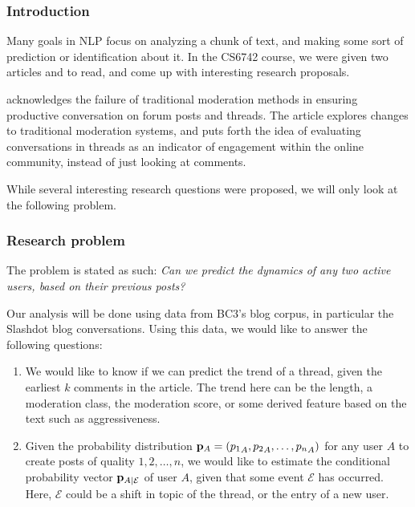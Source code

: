 \documentclass[a4paper,12pt]{article}
\numberwithin{equation}{section}
\begin{document}
 

\subsubsection*{Introduction}

% 


Many goals in NLP focus on analyzing a chunk of text, and making some sort of prediction or identification about it. In the CS6742 course, we were given two articles \cite{dejareview} and \cite{anae} to read, and come up with interesting research proposals. 

\cite{anae} acknowledges the failure of traditional moderation methods in ensuring productive conversation on forum posts and threads. The article explores changes to traditional moderation systems, and puts forth the idea of evaluating conversations in threads as an indicator of engagement within the online community, instead of just looking at comments.

While several interesting research questions were proposed, we will only look at the following problem.

\subsubsection*{Research problem}

The problem is stated as such: {\it Can we predict the dynamics of any two active users, based on their previous posts?}

Our analysis will be done using data from BC3's blog corpus, in particular the Slashdot blog conversations. Using this data, we would like to answer the following questions:
\vspace*{-0.5cm}
\begin{enumerate}
\item We would like to know if we can predict the trend of a thread, given the earliest $k$ comments in the article. The trend here can be the length, a moderation class, the moderation score, or some derived feature based on the text such as aggressiveness. 
\item Given the probability distribution ${\bf p}_A = ({p_1}_A, {p_2}_A,\hdots, {p_n}_A)$ for any user $A$ to create posts of quality $1,2,\hdots, n$, we would like to estimate the conditional probability vector ${\bf p}_{A|\mathcal E}$ of user $A$, given that some event $\mathcal E$ has occurred. Here, $\mathcal E$ could be a shift in topic of the thread, or the entry of a new user.
\end{enumerate}
\end{document}
